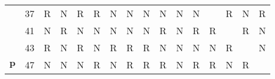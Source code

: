 \documentclass[17pt]{memoir}
\begin{document}
\begin{tabular}{@{}ll|llllllllllllll@{}}
                     & 37                       & \cellcolor[HTML]{FAC22B}R & N                         & \cellcolor[HTML]{FAC22B}R & \cellcolor[HTML]{FAC22B}R & N                         & N                         & N                         & N                         & N                         & N                         & \cellcolor[HTML]{000000}  & \cellcolor[HTML]{FAC22B}R & N                         & \cellcolor[HTML]{FAC22B}R \\
                     & 41                       & N                         & \cellcolor[HTML]{FAC22B}R & N                         & N                         & N                         & N                         & N                         & \cellcolor[HTML]{FAC22B}R & N                         & \cellcolor[HTML]{FAC22B}R & \cellcolor[HTML]{FAC22B}R & \cellcolor[HTML]{000000}  & \cellcolor[HTML]{FAC22B}R & N                         \\
                     & 43                       & \cellcolor[HTML]{FAC22B}R & N                         & \cellcolor[HTML]{FAC22B}R & N                         & \cellcolor[HTML]{FAC22B}R & \cellcolor[HTML]{FAC22B}R & \cellcolor[HTML]{FAC22B}R & N                         & N                         & N                         & N                         & \cellcolor[HTML]{FAC22B}R & \cellcolor[HTML]{000000}  & N                         \\
\multirow{-14}{*}{$\boldsymbol{p}$} & 47                       & N                         & N                         & N                         & \cellcolor[HTML]{FAC22B}R & N                         & \cellcolor[HTML]{FAC22B}R & \cellcolor[HTML]{FAC22B}R & \cellcolor[HTML]{FAC22B}R & N                         & \cellcolor[HTML]{FAC22B}R & \cellcolor[HTML]{FAC22B}R & N                         & \cellcolor[HTML]{FAC22B}R & \cellcolor[HTML]{000000} 
\end{tabular}
\end{document}
